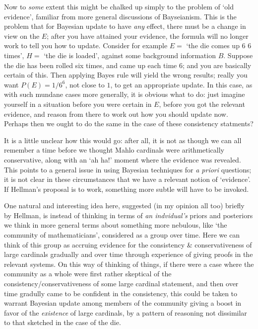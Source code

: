 \documentclass{amsart}
\theoremstyle{definition}
\begin{document}
Now to \emph{some} extent this might be chalked up simply to the problem of 
`old evidence', familiar from more general discussions of Bayseianism. This is the 
problem that for Bayesian update to have \emph{any} effect, there must be a 
change in view on the $E$; after you have attained your evidence,
the formula will no longer work to tell you how to update.
Consider for example $E =$ `the die comes up 6 6 times', 
$H =$ `the die is loaded', against some background information $B$. Suppose 
the die has been rolled six times, and came up each time 6; and you are basically 
certain of this. Then applying 
Bayes rule will yield the wrong results; really you want $P(E) = 1/6^6$, 
not close to $1$, to get an appropriate update. 
In this case, as with such mundane cases more generally, 
it is obvious what to do: just imagine yourself in a situation before you were 
certain in $E$, before you got the relevant evidence, and reason from there to work
out how you should update now. Perhaps then we ought to do the same in the case 
of these consistency statments?

It is a little unclear how this would go: after all, it 
is not as though we can all remember a time before we thought Mahlo cardinals 
were arithmetically conservative, along with an `ah ha!' moment where the evidence was revealed. 
This points to a general issue in using 
Bayesian techniques for \emph{a priori} questions; it is not clear in 
these circumstances that we have a relevant notion of `evidence'.
If Hellman's proposal is to work, something more subtle will have to be invoked.

One natural and interesting idea here, suggested (in my opinion all too) 
briefly by Hellman, is instead of thinking in terms of \emph{an indvidual's} priors 
and posteriors we think in more general terms about
something more nebulous, like `the community of mathematicians', considered as a 
group over time. Here we can think of this group as accruing evidence for the 
consistency \& conservativeness of large cardinals gradually and over time through experience
of giving proofs in the relevant systems. On this way of thinking of things, if there 
were a case where the community as a whole were first rather skeptical of the 
consistency/conservativeness of some large cardinal statement, and then over time gradully came to 
be confident in the consistency, this could be taken to warrant Bayesian update 
among members of the community giving a boost in favor of the \emph{existence} of 
large cardinals, by a pattern of reasoning not dissimilar to that sketched in the case of the 
die.
\end{document}
